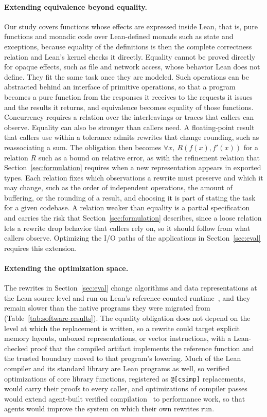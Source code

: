 \documentclass{article}
\begin{document}
\paragraph{Extending equivalence beyond equality.}
Our study covers functions whose effects are expressed inside Lean, that is, pure functions and monadic code over Lean-defined monads such as state and exceptions, because equality of the definitions is then the complete correctness relation and Lean's kernel checks it directly.
Equality cannot be proved directly for opaque effects, such as file and network access, whose behavior Lean does not define.
They fit the same task once they are modeled.
Such operations can be abstracted behind an interface of primitive operations, so that a program becomes a pure function from the responses it receives to the requests it issues and the results it returns, and equivalence becomes equality of those functions.
Concurrency requires a relation over the interleavings or traces that callers can observe.
Equality can also be stronger than callers need.
A floating-point result that callers use within a tolerance admits rewrites that change rounding, such as reassociating a sum.
The obligation then becomes $\forall x,\ R(f(x), f'(x))$ for a relation $R$ such as a bound on relative error, as with the refinement relation that Section~\ref{sec:formulation} requires when a new representation appears in exported types.
Each relation fixes which observations a rewrite must preserve and which it may change, such as the order of independent operations, the amount of buffering, or the rounding of a result, and choosing it is part of stating the task for a given codebase.
A relation weaker than equality is a partial specification and carries the risk that Section~\ref{sec:formulation} describes, since a loose relation lets a rewrite drop behavior that callers rely on, so it should follow from what callers observe.
Optimizing the I/O paths of the applications in Section~\ref{sec:eval} requires this extension.

\paragraph{Extending the optimization space.}
The rewrites in Section~\ref{sec:eval} change algorithms and data representations at the Lean source level and run on Lean's reference-counted runtime~\citep{ullrich2019counting}, and they remain slower than the native programs they were migrated from (Table~\ref{tab:software-results}).
The equality obligation does not depend on the level at which the replacement is written, so a rewrite could target explicit memory layouts, unboxed representations, or vector instructions, with a Lean-checked proof that the compiled artifact implements the reference function and the trusted boundary moved to that program's lowering.
Much of the Lean compiler and its standard library are Lean programs as well, so verified optimizations of core library functions, registered as \texttt{@[csimp]} replacements, would carry their proofs to every caller, and optimizations of compiler passes would extend agent-built verified compilation~\citep{rinard2026testing} to performance work, so that agents would improve the system on which their own rewrites run.
\end{document}
